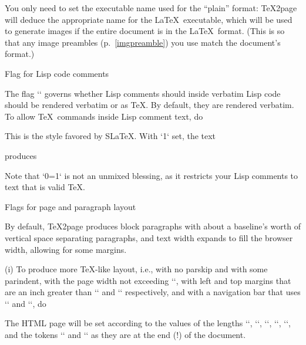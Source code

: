 \begintt
\def\TZPtexprogname{pdftex}
\endtt
%
You only need to set the executable name used for the “plain” format:
\TeX2page will deduce the appropriate name for the \LaTeX\ executable,
which will be used to generate images if the entire document is in the
\LaTeX\ format.  (This is so that any image preambles
(p.~\ref{imgpreamble}) you use match the
document’s format.)

\beginsection Flag for Lisp code comments

The flag `\TZPslatexcomments` governs whether Lisp comments
should inside verbatim Lisp code should be rendered verbatim or as \TeX.
By default, they are rendered verbatim.   To allow \TeX\ commands inside
Lisp comment text, do

\begintt
\let\TZPslatexcomments=1
\endtt
%
This is the style favored by S\LaTeX.
\ifx\shipout\UnDeFiNeD
With `\TZPslatexcomments` set, the text

\begintt
{}
\endtt
%
produces
\let\TZPslatexcomments 1

\let\TZPslatexcomments 0

\fi
Note that `\TZPslatexcomments=1` is not an unmixed blessing, as it
restricts your Lisp comments to text that is valid \TeX.

\beginsection Flags for page and paragraph layout

%
By default, \TeX2page produces block paragraphs with about a
baseline’s worth of vertical space separating paragraphs, and text width
expands to fill the browser width, allowing for some margins.

\item(i) To produce more \TeX-like layout, i.e., with no parskip and
with some parindent,
with the page width not exceeding `\hsize`,
with left and top margins that are an inch greater than
`\hoffset` and `\voffset` respectively, and with a
navigation bar that uses `\headline` and `\footline`,
do

\begintt
\let\TZPtexlayout=1
\endtt

%
The HTML page will be set according to the values of the
lengths `\hsize`, `\hoffset`, `\voffset`,
`\parskip`, `\parindent`, and the tokens `\headline`
and `\footline` as they are at the end (!) of
the document.

